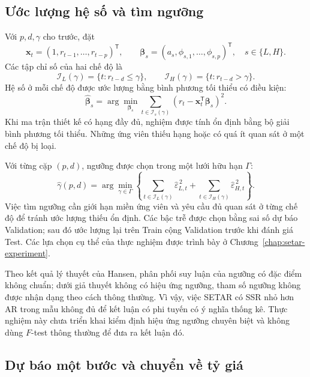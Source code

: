 \documentclass[a4paper,reqno,oneside]{book}
\numberwithin{equation}{chapter}
\begin{document}
\subsection{Ước lượng hệ số và tìm ngưỡng}

Với $p,d,\gamma$ cho trước, đặt
\[
 \mathbf x_t=(1,r_{t-1},\ldots,r_{t-p})^\mathsf T,
 \qquad
 \boldsymbol\beta_s=(a_s,\phi_{s,1},\ldots,\phi_{s,p})^\mathsf T,
 \quad s\in\{L,H\}.
\]
Các tập chỉ số của hai chế độ là
\[
 \mathcal I_L(\gamma)=\{t:r_{t-d}\leq\gamma\},
 \qquad
 \mathcal I_H(\gamma)=\{t:r_{t-d}>\gamma\}.
\]
Hệ số ở mỗi chế độ được ước lượng bằng bình phương tối thiểu có điều kiện:
\begin{equation}
 \widehat{\boldsymbol\beta}_s
 =\arg\min_{\boldsymbol\beta_s}
   \sum_{t\in\mathcal I_s(\gamma)}
     (r_t-\mathbf x_t^\mathsf T\boldsymbol\beta_s)^2.
 \label{eq:setar-cls}
\end{equation}
Khi ma trận thiết kế có hạng đầy đủ, nghiệm được tính ổn định bằng bộ giải bình phương tối thiểu. Những ứng viên thiếu hạng hoặc có quá ít quan sát ở một chế độ bị loại.

Với từng cặp $(p,d)$, ngưỡng được chọn trong một lưới hữu hạn $\Gamma$:
\begin{equation}
 \widehat\gamma(p,d)=\arg\min_{\gamma\in\Gamma}
   \left\{
     \sum_{t\in\mathcal I_L(\gamma)}\widehat\varepsilon_{L,t}^{\,2}
     +\sum_{t\in\mathcal I_H(\gamma)}\widehat\varepsilon_{H,t}^{\,2}
   \right\}.
 \label{eq:setar-threshold}
\end{equation}
Việc tìm ngưỡng cần giới hạn miền ứng viên và yêu cầu đủ quan sát ở từng chế độ để tránh ước lượng thiếu ổn định. Các bậc trễ được chọn bằng sai số dự báo Validation; sau đó ước lượng lại trên Train cộng Validation trước khi đánh giá Test. Các lựa chọn cụ thể của thực nghiệm được trình bày ở Chương~\ref{chap:setar-experiment}.

Theo kết quả lý thuyết của Hansen, phân phối suy luận của ngưỡng có đặc điểm không chuẩn; dưới giả thuyết không có hiệu ứng ngưỡng, tham số ngưỡng không được nhận dạng theo cách thông thường. Vì vậy, việc SETAR có SSR nhỏ hơn AR trong mẫu không đủ để kết luận có phi tuyến có ý nghĩa thống kê. Thực nghiệm này chưa triển khai kiểm định hiệu ứng ngưỡng chuyên biệt và không dùng $F$-test thông thường để đưa ra kết luận đó.

\subsection{Dự báo một bước và chuyển về tỷ giá}
\end{document}
